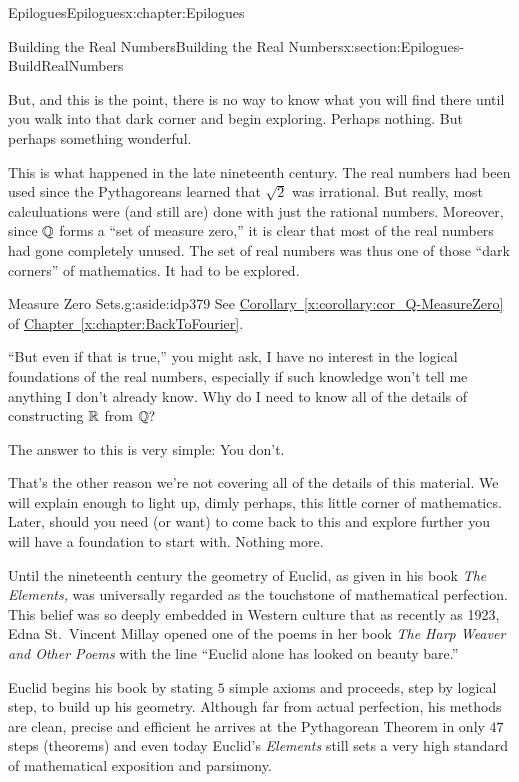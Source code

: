 \begin{chapterptx}{Epilogues}{}{Epilogues}{}{}{x:chapter:Epilogues}
\begin{sectionptx}{Building the Real Numbers}{}{Building the Real Numbers}{}{}{x:section:Epilogues-BuildRealNumbers}
\begin{introduction}{}
			\par
			But, and this is the point, there is no way to know what you will find there until you walk into that dark corner and begin exploring.  Perhaps nothing.  But perhaps something wonderful.%
			\par
			This is what happened in the late nineteenth century.  The real numbers had been used since the Pythagoreans learned that \(\sqrt{2}\) was irrational.  But really, most calculuations were (and still are) done with just the rational numbers. Moreover, since \(\mathbb {Q}\) forms a ``set of measure zero,''  it is clear that most of the real numbers had gone completely unused. The set of real numbers was thus one of those ``dark corners'' of mathematics. It had to be explored.%
			\begin{aside}{Measure Zero Sets.}{g:aside:idp379}%
				See \hyperref[x:corollary:cor_Q-MeasureZero]{Corollary~{\xreffont\ref{x:corollary:cor_Q-MeasureZero}}} of \hyperref[x:chapter:BackToFourier]{Chapter~{\xreffont\ref{x:chapter:BackToFourier}}}.%
			\end{aside}
			``But even if that is true,'' you might ask, \textasciigrave{}\textasciigrave{}I have no interest in the logical foundations of the real numbers, especially if such knowledge won't tell me anything I don't already know. Why do I need to know all of the details of constructing \(\mathbb {R}\) from \(\mathbb {Q}?\)%
			\par
			The answer to this is very simple: You don't.%
			\par
			That's the other reason we're not covering all of the details of this material. We will explain enough to light up, dimly perhaps, this little corner of mathematics. Later, should you need (or want) to come back to this and explore further you will have a foundation to start with. Nothing more.%
			\par
			Until the nineteenth century the geometry of Euclid, as given in his book \emph{The Elements,} was universally regarded as the touchstone of mathematical perfection. This belief was so deeply embedded in Western culture that as recently as 1923, Edna St.~Vincent Millay opened one of the poems in her book \emph{The Harp Weaver and Other Poems} with the line ``Euclid alone has looked on beauty bare.''%
			\par
			Euclid begins his book by stating \(5\) simple axioms and proceeds, step by logical step, to build up his geometry. Although far from actual perfection, his methods are clean, precise and efficient \textemdash{} he arrives at the Pythagorean Theorem in only \(47\) steps (theorems) \textemdash{} and even today Euclid's \emph{Elements} still sets a very high standard of mathematical exposition and parsimony.%

\end{introduction}
\end{sectionptx}
\end{chapterptx}
